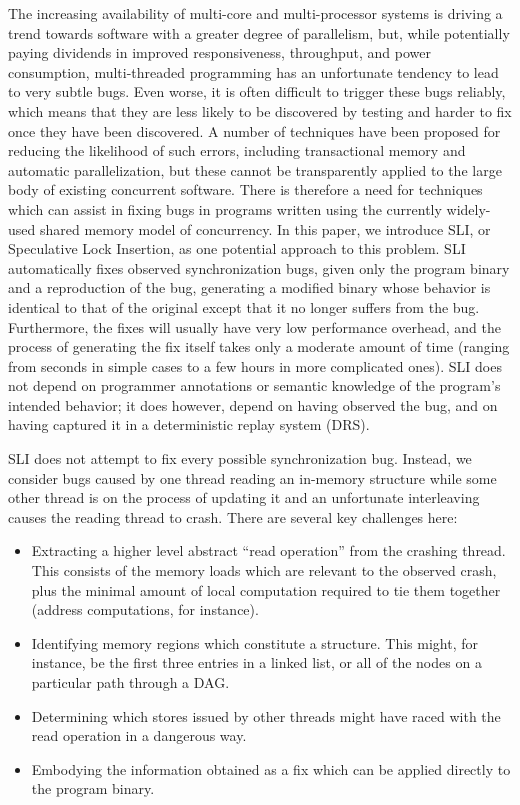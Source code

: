 \documentclass[10pt,twocolumn,preprint,natbib,authoryear]{sigplanconf}
\begin{document}
The increasing availability of multi-core and multi-processor systems
is driving a trend towards software with a greater degree of
parallelism, but, while potentially paying dividends in improved
responsiveness, throughput, and power consumption, multi-threaded
programming has an unfortunate tendency to lead to very subtle bugs.
Even worse, it is often difficult to trigger these bugs reliably,
which means that they are less likely to be discovered by testing and
harder to fix once they have been discovered.  A number of techniques
have been proposed for reducing the likelihood of such errors,
including transactional memory\cite{Shavit1997} and automatic
parallelization\cite{Bacon1994}, but these cannot be transparently
applied to the large body of existing concurrent software.  There is
therefore a need for techniques which can assist in fixing bugs in
programs written using the currently widely-used shared memory model
of concurrency.  In this paper, we introduce SLI, or Speculative Lock
Insertion, as one potential approach to this problem.  SLI
automatically fixes observed synchronization bugs, given only the
program binary and a reproduction of the bug, generating a modified
binary whose behavior is identical to that of the original except that
it no longer suffers from the bug.  Furthermore, the fixes will
usually have very low performance overhead, and the process of
generating the fix itself takes only a moderate amount of time
(ranging from seconds in simple cases to a few hours in more
complicated ones).  SLI does not depend on programmer annotations or
semantic knowledge of the program's intended behavior; it does
however, depend on having observed the bug, and on having captured it
in a deterministic replay system (DRS).

SLI does not attempt to fix every possible synchronization bug.
Instead, we consider bugs caused by one thread reading an in-memory
structure while some other thread is on the process of updating it and
an unfortunate interleaving causes the reading thread to crash.  There
are several key challenges here:

\begin{itemize}
\item Extracting a higher level abstract ``read operation'' from the
  crashing thread.  This consists of the memory loads which are
  relevant to the observed crash, plus the minimal amount of local
  computation required to tie them together (address computations, for
  instance).

\item Identifying memory regions which constitute a structure.  This
  might, for instance, be the first three entries in a linked list, or
  all of the nodes on a particular path through a
  DAG.

\item Determining which stores issued by other threads might have
  raced with the read operation in a dangerous way.

\item Embodying the information obtained as a fix which can be applied
  directly to the program binary.
\end{itemize}
\end{document}
